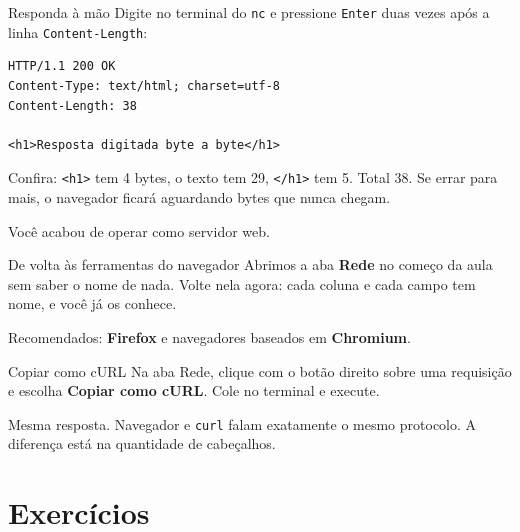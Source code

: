 \documentclass{beamer}
\begin{document}
\begin{frame}[fragile]{Responda à mão}
  Digite no terminal do \texttt{nc} e pressione \texttt{Enter} duas vezes após a
  linha \texttt{Content-Length}:

  \begin{verbatim}
HTTP/1.1 200 OK
Content-Type: text/html; charset=utf-8
Content-Length: 38

<h1>Resposta digitada byte a byte</h1>
  \end{verbatim}

  Confira: \texttt{<h1>} tem 4 bytes, o texto tem 29, \texttt{</h1>} tem 5.
  Total 38. Se errar para mais, o navegador ficará aguardando bytes que nunca
  chegam.

  \vspace{0.3cm}
  \begin{center}
    \large Você acabou de operar como servidor web.
  \end{center}
\end{frame}

\begin{frame}{De volta às ferramentas do navegador}
  Abrimos a aba \textbf{Rede} no começo da aula sem saber o nome de nada.
  Volte nela agora: cada coluna e cada campo tem nome, e você já os conhece.

  \vspace{0.3cm}
  Recomendados: \textbf{Firefox} e navegadores baseados em \textbf{Chromium}.

  \vspace{0.5cm}
  \begin{block}{Copiar como cURL}
    Na aba Rede, clique com o botão direito sobre uma requisição e escolha
    \textbf{Copiar como cURL}. Cole no terminal e execute.

    \vspace{0.2cm}
    Mesma resposta. Navegador e \texttt{curl} falam exatamente o mesmo
    protocolo. A diferença está na quantidade de cabeçalhos.
  \end{block}
\end{frame}

\section{Exercícios}
\end{document}
